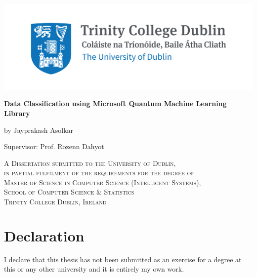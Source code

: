 \documentclass[english,a4paper,11pt,oneside,onecolumn]{book}
\begin{document}
\renewcommand{\footrulewidth}{1pt}







\begin{titlepage}
	\centering
	
\includegraphics[width=.8\linewidth]{Images/trinity-common-use.jpg}\par\vspace{2cm}
%
	\vspace{2cm}
	{\huge\bfseries Data Classification using Microsoft Quantum Machine Learning Library\par}
	\vspace{1cm}
	{\scshape \par}
	\vspace{2cm}
	{\Large by Jayprakash Asolkar \par}
	{\Large Supervisor: Prof. Rozenn Dahyot \par}
 \vspace{1cm}
{\scshape 
A Dissertation submitted to the University of Dublin,\\
in partial fulfilment of the requirements for the degree of\\
Master of Science in Computer Science (Intelligent Systems),\\
School of Computer Science \& Statistics\\ 
Trinity College Dublin, Ireland\\
}
\end{titlepage}

\clearpage

\chapter*{Declaration}

I declare that this thesis has not been submitted as an exercise for a degree at this or
any other university and it is entirely my own work.

\vspace{0.5cm}
\end{document}
